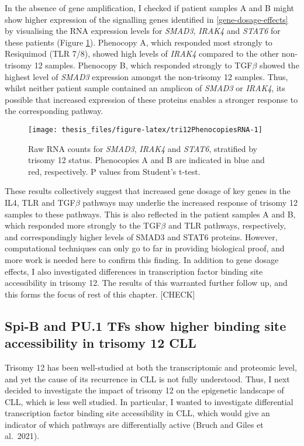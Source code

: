 \documentclass[11pt, a4paper, twosided]{book}
\begin{document}
In the absence of gene amplification, I checked if patient samples A and B might show higher expression of the signalling genes identified in \ref{gene-dosage-effects} by visualising the RNA expression levels for \emph{SMAD3}, \emph{IRAK4} and \emph{STAT6} for these patients (Figure \ref{fig:tri12PhenocopiesRNA}). Phenocopy A, which responded most strongly to Resiquimod (TLR 7/8), showed high levels of \emph{IRAK4} compared to the other non-trisomy 12 samples. Phenocopy B, which responded strongly to TGF\(\beta\) showed the highest level of \emph{SMAD3} expression amongst the non-trisomy 12 samples. Thus, whilst neither patient sample contained an amplicon of \emph{SMAD3} or \emph{IRAK4}, its possible that increased expression of these proteins enables a stronger response to the corresponding pathway.


\begin{figure}

{\centering \texttt{[image: thesis\_files/figure-latex/tri12PhenocopiesRNA-1]} 

}

\caption{Raw RNA counts for \emph{SMAD3}, \emph{IRAK4} and \emph{STAT6}, stratified by trisomy 12 status. Phenocopies A and B are indicated in blue and red, respectively. P values from Student's t-test.}\label{fig:tri12PhenocopiesRNA}
\end{figure}
These results collectively suggest that increased gene dosage of key genes in the IL4, TLR and TGF\(\beta\) pathways may underlie the increased response of trisomy 12 samples to these pathways. This is also reflected in the patient samples A and B, which responded more strongly to the TGF\(\beta\) and TLR pathways, respectively, and correspondingly higher levels of SMAD3 and STAT6 proteins. However, computational techniques can only go to far in providing biological proof, and more work is needed here to confirm this finding. In addition to gene dosage effects, I also investigated differences in transcription factor binding site accessibility in trisomy 12. The results of this warranted further follow up, and this forms the focus of rest of this chapter. {[}CHECK{]}

\hypertarget{trisomy12-ATACseq}{%
\subsection{Spi-B and PU.1 TFs show higher binding site accessibility in trisomy 12 CLL}\label{trisomy12-ATACseq}}

Trisomy 12 has been well-studied at both the transcriptomic and proteomic level, and yet the cause of its recurrence in CLL is not fully understood. Thus, I next decided to investigate the impact of trisomy 12 on the epigenetic landscape of CLL, which is less well studied. In particular, I wanted to investigate differential transcription factor binding site accessibility in CLL, which would give an indicator of which pathways are differentially active (Bruch and Giles et al.~2021).
\end{document}
